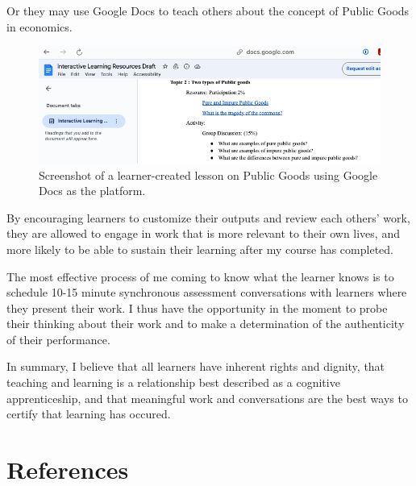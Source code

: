 \documentclass[
  letterpaper,
  DIV=11,
  numbers=noendperiod]{scrartcl}
\begin{document}
Or they may use Google Docs to teach others about the concept of Public
Goods in economics.

\begin{figure}[H]

{\centering \includegraphics{assets/ILR-gdocs.png}

}

\caption{Screenshot of a learner-created lesson on Public Goods using
Google Docs as the platform.}

\end{figure}%

By encouraging learners to customize their outputs and review each
others' work, they are allowed to engage in work that is more relevant
to their own lives, and more likely to be able to sustain their learning
after my course has completed.

The most effective process of me coming to know what the learner knows
is to schedule 10-15 minute synchronous assessment conversations with
learners where they present their work. I thus have the opportunity in
the moment to probe their thinking about their work and to make a
determination of the authenticity of their performance.

In summary, I believe that all learners have inherent rights and
dignity, that teaching and learning is a relationship best described as
a cognitive apprenticeship, and that meaningful work and conversations
are the best ways to certify that learning has occured.

\section*{References}\label{references}
\end{document}

